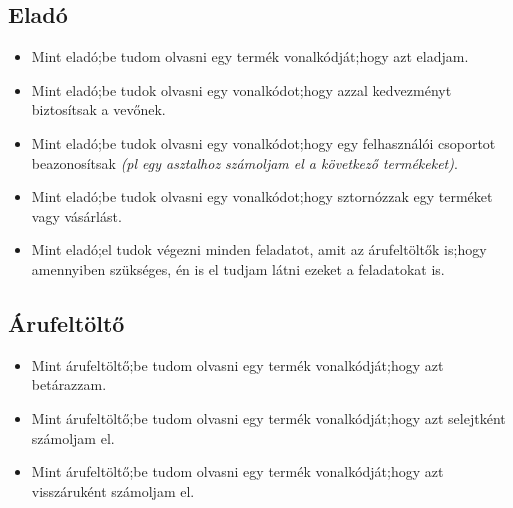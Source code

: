 \documentclass[12pt,a4paper]{article}
\begin{document}
	\subsection{Eladó}
	\begin{itemize}
		\item Mint eladó;\newline be tudom olvasni egy termék vonalkódját;\newline hogy azt eladjam.
		\item Mint eladó;\newline be tudok olvasni egy vonalkódot;\newline hogy azzal kedvezményt biztosítsak a vevőnek.
		\item Mint eladó;\newline be tudok olvasni egy vonalkódot;\newline hogy egy felhasználói csoportot beazonosítsak \textit{(pl egy asztalhoz számoljam el a következő termékeket)}.
		\item Mint eladó;\newline be tudok olvasni egy vonalkódot;\newline hogy sztornózzak egy terméket vagy vásárlást.
		\item Mint eladó;\newline el tudok végezni minden feladatot, amit az árufeltöltők is;\newline  hogy amennyiben szükséges, én is el tudjam látni ezeket a feladatokat is.
	\end{itemize}
	
	\subsection{Árufeltöltő}
	\begin{itemize}
		\item Mint árufeltöltő;\newline be tudom olvasni egy termék vonalkódját;\newline hogy azt betárazzam.
		\item Mint árufeltöltő;\newline be tudom olvasni egy termék vonalkódját;\newline hogy azt selejtként számoljam el.
		\item Mint árufeltöltő;\newline be tudom olvasni egy termék vonalkódját;\newline hogy azt visszáruként számoljam el.
	\end{itemize}
	
\end{document}
